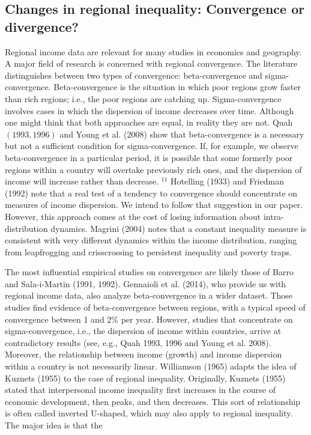 \documentclass[10pt]{article}
\begin{document}
\subsection{Changes in regional inequality: Convergence or divergence?}
Regional income data are relevant for many studies in economics and geography. A major field of research is concerned with regional convergence. The literature distinguishes between two types of convergence: beta-convergence and sigma-convergence. Beta-convergence is the situation in which poor regions grow faster than rich regions; i.e., the poor regions are catching up. Sigma-convergence involves cases in which the dispersion of income decreases over time. Although one might think that both approaches are equal, in reality they are not. Quah $(1993,1996)$ and Young et al. (2008) show that beta-convergence is a necessary but not a sufficient condition for sigma-convergence. If, for example, we observe beta-convergence in a particular period, it is possible that some formerly poor regions within a country will overtake previously rich ones, and the dispersion of income will increase rather than decrease. ${ }^{11}$ Hotelling (1933) and Friedman (1992) note that a real test of a tendency to convergence should concentrate on measures of income dispersion. We intend to follow that suggestion in our paper. However, this approach comes at the cost of losing information about intra-distribution dynamics. Magrini (2004) notes that a constant inequality measure is consistent with very different dynamics within the income distribution, ranging from leapfrogging and crisscrossing to persistent inequality and poverty traps.

The most influential empirical studies on convergence are likely those of Barro and Sala-i-Martin (1991, 1992). Gennaioli et al. (2014), who provide us with regional income data, also analyze beta-convergence in a wider dataset. Those studies find evidence of beta-convergence between regions, with a typical speed of convergence between 1 and $2 \%$ per year. However, studies that concentrate on sigma-convergence, i.e., the dispersion of income within countries, arrive at contradictory results (see, e.g., Quah 1993, 1996 and Young et al. 2008). Moreover, the relationship between income (growth) and income dispersion within a country is not necessarily linear. Williamson (1965) adapts the idea of Kuznets (1955) to the case of regional inequality. Originally, Kuznets (1955) stated that interpersonal income inequality first increases in the course of economic development, then peaks, and then decreases. This sort of relationship is often called inverted U-shaped, which may also apply to regional inequality. The major idea is that the
\end{document}
